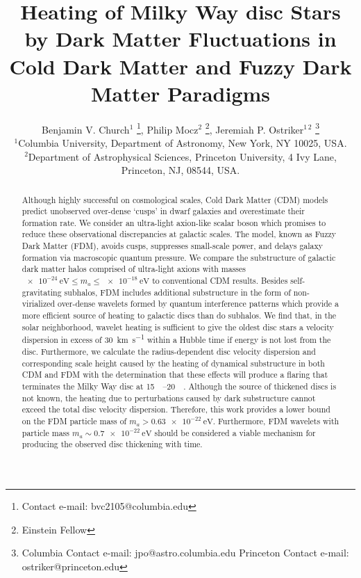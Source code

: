 \documentclass[usenatbib]{mnras}
\newcommand{\squote}[1]{\lq #1\rq}
\newcommand{\poweV}[1]{\SI{e#1}{\electronvolt}}
\begin{document}
\title[Dark Matter Heating]{Heating of Milky Way disc Stars by Dark Matter Fluctuations in Cold Dark Matter and Fuzzy Dark Matter Paradigms}
\author[B. V. Church et al.]{
Benjamin V. Church$^{1}$ \thanks{Contact e-mail: bvc2105@columbia.edu}, Philip Mocz$^{2}$ \thanks{Einstein Fellow},
Jeremiah P. Ostriker$^{1 \, 2}$ \thanks{Columbia Contact e-mail: jpo@astro.columbia.edu 
\newline
Princeton Contact e-mail: ostriker@princeton.edu} 
\\
$^{1}$Columbia University, Department of Astronomy, New York, NY 10025, USA.
\\
$^{2}$Department of Astrophysical Sciences, Princeton University, 4 Ivy Lane, Princeton, NJ, 08544, USA.}
\maketitle
\begin{abstract}
Although highly successful on cosmological scales, Cold Dark Matter (CDM) models predict unobserved over-dense \squote{cusps} in dwarf galaxies and overestimate their formation rate. We consider an ultra-light axion-like scalar boson which promises to reduce these observational discrepancies at galactic scales. The model, known as Fuzzy Dark Matter (FDM), avoids cusps, suppresses small-scale power, and delays galaxy formation via macroscopic quantum pressure. We compare the substructure of galactic dark matter halos comprised of ultra-light axions with masses $\poweV{-24} \leq m_a \leq \poweV{-18}$ to conventional CDM results. Besides self-gravitating subhalos, FDM includes additional substructure in the form of non-virialized over-dense wavelets formed by quantum interference patterns which provide a more efficient source of heating to galactic discs than do subhalos. We find that, in the solar neighborhood, wavelet heating is sufficient to give the oldest disc stars a velocity dispersion in excess of \SI{30}{\kilo\meter\per\second} within a Hubble time if energy is not lost from the disc. 
Furthermore, we calculate the radius-dependent disc velocity dispersion and corresponding scale height caused by the heating of dynamical substructure in both CDM and FDM with the determination that these effects will produce a flaring that terminates the Milky Way disc at \SIrange{15}{20}{\kilo \parsec}. Although the source of thickened discs is not known, the heating due to perturbations caused by dark substructure cannot exceed the total disc velocity dispersion. Therefore, this work provides a lower bound on the FDM particle mass of $m_a > \SI{0.63 e-22}{\electronvolt}$. Furthermore, FDM wavelets with particle mass $m_a \sim \SI{0.7e-22}{\electronvolt}$ should be considered a viable mechanism for producing the observed disc thickening with time.
\end{abstract}
\end{document}
